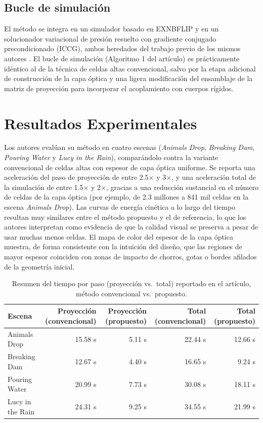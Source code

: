 \documentclass[sigconf,nonacm]{acmart}
\begin{document}
\subsection{Bucle de simulación}
El método se integra en un simulador basado en EXNBFLIP y en un solucionador variacional de presión resuelto con gradiente conjugado precondicionado (ICCG), ambos heredados del trabajo previo de los mismos autores \cite{narita2026}. El bucle de simulación (Algoritmo 1 del artículo) es prácticamente idéntico al de la técnica de celdas altas convencional, salvo por la etapa adicional de construcción de la capa óptica y una ligera modificación del ensamblaje de la matriz de proyección para incorporar el acoplamiento con cuerpos rígidos.

\section{Resultados Experimentales}
Los autores evalúan su método en cuatro escenas (\emph{Animals Drop}, \emph{Breaking Dam}, \emph{Pouring Water} y \emph{Lucy in the Rain}), comparándolo contra la variante convencional de celdas altas con espesor de capa óptica uniforme. Se reporta una aceleración del paso de proyección de entre 2.5$\times$ y 3$\times$, y una aceleración total de la simulación de entre 1.5$\times$ y 2$\times$, gracias a una reducción sustancial en el número de celdas de la capa óptica (por ejemplo, de 2.3 millones a 841 mil celdas en la escena \emph{Animals Drop}). Las curvas de energía cinética a lo largo del tiempo resultan muy similares entre el método propuesto y el de referencia, lo que los autores interpretan como evidencia de que la calidad visual se preserva a pesar de usar muchas menos celdas. El mapa de color del espesor de la capa óptica muestra, de forma consistente con la intuición del diseño, que las regiones de mayor espesor coinciden con zonas de impacto de chorros, gotas o bordes afilados de la geometría inicial.

\begin{table}[t]
\caption{Resumen del tiempo por paso (proyección vs.\ total) reportado en el artículo, método convencional vs.\ propuesto.}
\label{tab:resultados}
\small
\begin{tabular}{lrrrr}
\toprule
\textbf{Escena} & \textbf{Proyección (convencional)} & \textbf{Proyección (propuesto)} & \textbf{Total (convencional)} & \textbf{Total (propuesto)} \\
\midrule
Animals Drop     & 15.58 s & 5.11 s  & 22.44 s & 12.66 s \\
Breaking Dam     & 12.67 s & 4.40 s  & 16.65 s & 9.24 s  \\
Pouring Water    & 20.99 s & 7.73 s  & 30.08 s & 18.11 s \\
Lucy in the Rain & 24.31 s & 9.25 s  & 34.55 s & 21.99 s \\
\bottomrule
\end{tabular}
\end{table}
\end{document}
